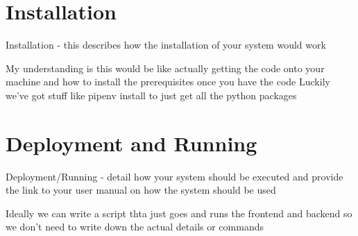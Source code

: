 \documentclass{article}
\begin{document}
\section{Installation}
Installation - this describes how the installation of your system would work

My understanding is this would be like actually getting the code onto your machine and how to install the prerequisites once you have the code
Luckily we've got stuff like pipenv install to just get all the python packages


\section{Deployment and Running}
Deployment/Running - detail how your system should be executed and provide the link to your user
manual on how the system should be used

Ideally we can write a script thta just goes and runs the frontend and backend so we don't need to write down the actual details or commands
\end{document}

